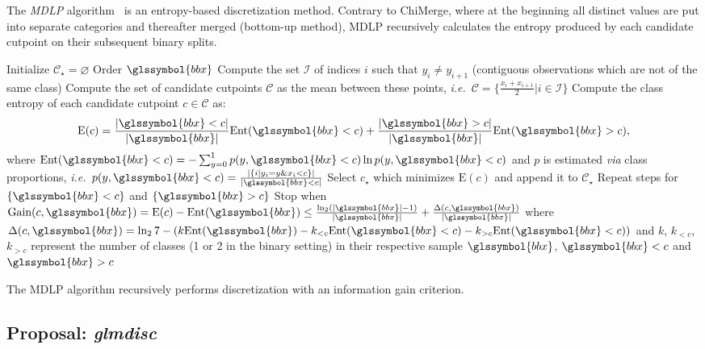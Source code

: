 The \textit{MDLP} algorithm~\cite{fayyad1993multi} is an entropy-based discretization method. Contrary to ChiMerge, where at the beginning all distinct values are put into separate categories and thereafter merged (bottom-up method), MDLP recursively calculates the entropy produced by each candidate cutpoint on their subsequent binary splits.

\begin{algorithm}[H]
 Initialize $\mathcal{C}_\star = \varnothing$\;
Order $\glssymbol{bbx}$\;
Compute the set $\mathcal{I}$ of indices $i$ such that $y_i \neq y_{i+1}$ (contiguous observations which are not of the same class)\;
Compute the set of candidate cutpoints $\mathcal{C}$ as the mean between these points, \textit{i.e.}\ $\mathcal{C} = \{\frac{x_i + x_{i+1}}{2} | i \in \mathcal{I} \}$\;
Compute the class entropy of each candidate cutpoint $c \in \mathcal{C}$ as:
\[ \text{E}(c) = \frac{|\glssymbol{bbx} < c|}{|\glssymbol{bbx}|} \text{Ent}(\glssymbol{bbx} < c) + \frac{|\glssymbol{bbx} > c|}{|\glssymbol{bbx}|} \text{Ent}(\glssymbol{bbx} > c), \]
where $\text{Ent}(\glssymbol{bbx} < c) = - \sum_{y=0}^1 p(y,\glssymbol{bbx} < c) \ln p(y,\glssymbol{bbx} < c)$ and $p$ is estimated \textit{via} class proportions, \textit{i.e.}\ $p(y,\glssymbol{bbx} < c) = \frac{|\{i | y_i = y \& x_i < c \}|}{|\glssymbol{bbx} < c|}$\;
Select $c_\star$ which minimizes $\text{E}(c)$ and append it to $\mathcal{C}_\star$\;
Repeat steps for $\{\glssymbol{bbx}< c\}$ and $\{\glssymbol{bbx} > c\}$\;
Stop when $\text{Gain}(c,\glssymbol{bbx}) = \text{E}(c) - \text{Ent}(\glssymbol{bbx}) \leq \frac{\ln_2 (|\glssymbol{bbx}|-1)}{|\glssymbol{bbx}|} + \frac{\Delta(c,\glssymbol{bbx}) }{|\glssymbol{bbx}|}$ where $\Delta(c,\glssymbol{bbx}) = \ln_2 7 - (k \text{Ent}(\glssymbol{bbx}) - k_{<c}\text{Ent}(\glssymbol{bbx} < c) - k_{>c}\text{Ent}(\glssymbol{bbx} < c))$ and $k$, $k_{<c}$, $k_{>c}$ represent the number of classes (1 or 2 in the binary setting) in their respective sample $\glssymbol{bbx}$, $\glssymbol{bbx} < c$ and $\glssymbol{bbx} > c$\;
 \caption{\label{mdlp} The MDLP algorithm recursively performs discretization with an information gain criterion.}
\end{algorithm}


\subsection{Proposal: \textit{glmdisc}}


